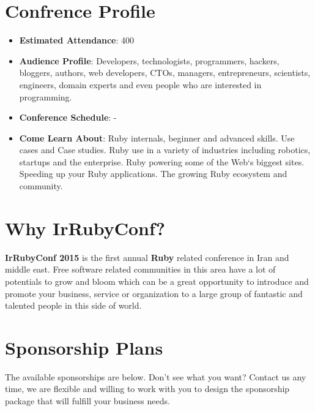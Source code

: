 \documentclass[a4paper,12pt]{article}
\begin{document}
\section*{Confrence Profile}
\begin{itemize}
\item{\textbf{Estimated Attendance}: 400}
\item{\textbf{Audience Profile}: Developers, technologists, programmers, hackers, bloggers, authors, web developers, CTOs, managers, entrepreneurs, scientists, engineers, domain experts and even people who are interested in programming.
}
\item{\textbf{Conference Schedule}: -}
\item{\textbf{Come Learn About}: Ruby internals, beginner and advanced skills. Use cases and Case studies. Ruby use in a variety of industries including robotics, startups and the enterprise. Ruby powering some of the Web`s biggest sites. Speeding up your Ruby applications. The growing Ruby ecosystem and community.
}
\end{itemize}

\section*{Why IrRubyConf?}
\textbf{IrRubyConf 2015} is the first annual \textbf{Ruby} related conference in Iran and middle east. Free software related communities in this area have a lot of potentials to grow and bloom which can be a great opportunity to introduce and promote your business, service or organization to a large group of fantastic and talented people in this side of world.
\section*{Sponsorship Plans}
The available sponsorships are below. Don't see what you want? Contact us any time, we are flexible and willing to work with you to design the sponsorship package that will fulfill your business needs.
\end{document}
